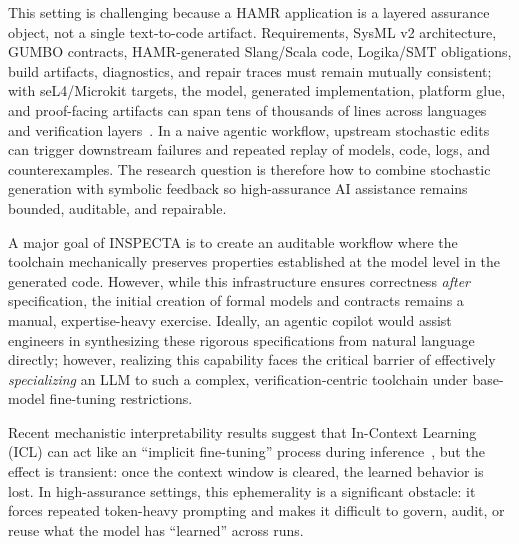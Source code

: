 \documentclass[conference]{IEEEtran}
\begin{document}
This setting is challenging because a HAMR application is a layered assurance object, not a single text-to-code artifact. Requirements, SysML v2 architecture, GUMBO contracts, HAMR-generated Slang/Scala code, Logika/SMT obligations, build artifacts, diagnostics, and repair traces must remain mutually consistent; with seL4/Microkit targets, the model, generated implementation, platform glue, and proof-facing artifacts can span tens of thousands of lines across languages and verification layers~\cite{hamr,hamr-sel4,sel4_klein2009}. In a naive agentic workflow, upstream stochastic edits can trigger downstream failures and repeated replay of models, code, logs, and counterexamples. The research question is therefore how to combine stochastic generation with symbolic feedback so high-assurance AI assistance remains bounded, auditable, and repairable.

A major goal of INSPECTA is to create an auditable workflow where the toolchain mechanically preserves properties established at the model level in the generated code. However, while this infrastructure ensures correctness \emph{after} specification, the initial creation of formal models and contracts remains a manual, expertise-heavy exercise. Ideally, an agentic copilot would assist engineers in synthesizing these rigorous specifications from natural language directly; however, realizing this capability faces the critical barrier of effectively \emph{specializing} an LLM to such a complex, verification-centric toolchain under base-model fine-tuning restrictions.

Recent mechanistic interpretability results suggest that In-Context Learning (ICL) can act like an ``implicit fine-tuning'' process during inference~\cite{vonoswald2023transformers}, but the effect is transient: once the context window is cleared, the learned behavior is lost. In high-assurance settings, this ephemerality is a significant obstacle: it forces repeated token-heavy prompting and makes it difficult to govern, audit, or reuse what the model has ``learned'' across runs.
\end{document}
